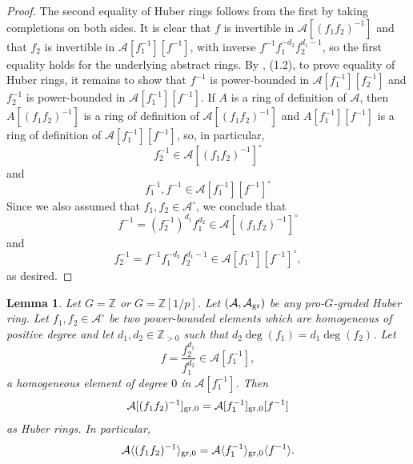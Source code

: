 \documentclass[12pt,twoside,a4paper]{article}
\newtheorem{lemma}[thm]{Lemma}
\theoremstyle{definition}
\theoremstyle{remark}
\newcommand\gr{{\rm gr}}
\begin{document}
\begin{proof}The second equality of Huber rings follows from the first by taking completions on both sides. It is clear that $f$ is invertible in $\mathcal{A}[(f_{1}f_{2})^{-1}]$ and that $f_{2}$ is invertible in $\mathcal{A}[f_{1}^{-1}][f^{-1}]$, with inverse $f^{-1}f_{1}^{-d_{2}}f_{2}^{d_{1}-1}$, so the first equality holds for the underlying abstract rings. By \cite{Huber1}, (1.2), to prove equality of Huber rings, it remains to show that $f^{-1}$ is power-bounded in $\mathcal{A}[f_{1}^{-1}][f_{2}^{-1}]$ and $f_{2}^{-1}$ is power-bounded in $\mathcal{A}[f_{1}^{-1}][f^{-1}]$. If $A$ is a ring of definition of $\mathcal{A}$, then $A[(f_{1}f_{2})^{-1}]$ is a ring of definition of $\mathcal{A}[(f_{1}f_{2})^{-1}]$ and $A[f_{1}^{-1}][f^{-1}]$ is a ring of definition of $\mathcal{A}[f_{1}^{-1}][f^{-1}]$, so, in particular, \begin{equation*}f_{2}^{-1}\in \mathcal{A}[(f_{1}f_{2})^{-1}]^{\circ}\end{equation*}and \begin{equation*}f_{1}^{-1}, f^{-1}\in \mathcal{A}[f_{1}^{-1}][f^{-1}]^{\circ}\end{equation*}Since we also assumed that $f_{1}, f_{2}\in \mathcal{A}^{\circ}$, we conclude that \begin{equation*}f^{-1}=(f_{2}^{-1})^{d_{1}}f_{1}^{d_{2}}\in \mathcal{A}[(f_{1}f_{2})^{-1}]^{\circ}\end{equation*}and \begin{equation*}f_{2}^{-1}=f^{-1}f_{1}^{-d_{2}}f_{2}^{d_{1}-1}\in \mathcal{A}[f_{1}^{-1}][f^{-1}]^{\circ},\end{equation*}as desired.\end{proof}
\begin{lemma}\label{Gluing 1, part 3}Let $G=\mathbb{Z}$ or $G=\mathbb{Z}[1/p]$. Let $(\mathcal{A}, \mathcal{A}_{\gr})$ be any pro-$G$-graded Huber ring. Let $f_{1}, f_{2}\in \mathcal{A}^{\circ}$ be two power-bounded elements which are homogeneous of positive degree and let $d_{1}, d_{2}\in \mathbb{Z}_{>0}$ such that $d_{2}\deg(f_{1})=d_{1}\deg(f_{2})$. Let \begin{equation*}f=\frac{f_{2}^{d_{1}}}{f_{1}^{d_{2}}}\in \mathcal{A}[f_{1}^{-1}],\end{equation*}a homogeneous element of degree $0$ in $\mathcal{A}[f_{1}^{-1}] $. Then \begin{equation*}\mathcal{A}[(f_{1}f_{2})^{-1}]_{\gr,0}=\mathcal{A}[f_{1}^{-1}]_{\gr,0}[f^{-1}]\end{equation*}as Huber rings. In particular, \begin{equation*}\mathcal{A}\langle (f_{1}f_{2})^{-1}\rangle_{\gr,0}=\mathcal{A}\langle f_{1}^{-1}\rangle_{\gr,0}\langle f^{-1}\rangle. \end{equation*}\end{lemma}
\end{document}
